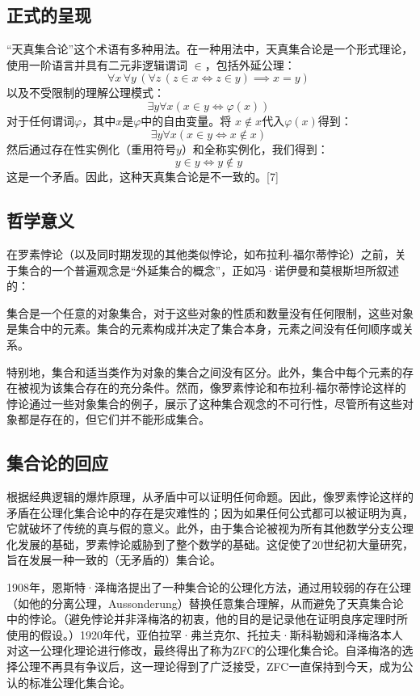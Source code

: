 \subsection{正式的呈现}  
“天真集合论”这个术语有多种用法。在一种用法中，天真集合论是一个形式理论，使用一阶语言并具有二元非逻辑谓词  
\(\in\)，包括外延公理：
\[
\forall x\,\forall y\,(\forall z\,(z \in x \iff z \in y) \implies x = y)~
\]
以及不受限制的理解公理模式：
\[
\exists y \forall x (x \in y \iff \varphi(x))~
\]
对于任何谓词\(\varphi\)，其中\(x\)是\(\varphi\)中的自由变量。将  
\(x \notin x\)代入\(\varphi(x)\)得到：
\[
\exists y \forall x (x \in y \iff x \notin x)~
\]
然后通过存在性实例化（重用符号\(y\)）和全称实例化，我们得到：
\[
y \in y \iff y \notin y~
\]
这是一个矛盾。因此，这种天真集合论是不一致的。[7]
\subsection{哲学意义}  
在罗素悖论（以及同时期发现的其他类似悖论，如布拉利-福尔蒂悖论）之前，关于集合的一个普遍观念是“外延集合的概念”，正如冯·诺伊曼和莫根斯坦所叙述的：

集合是一个任意的对象集合，对于这些对象的性质和数量没有任何限制，这些对象是集合中的元素。集合的元素构成并决定了集合本身，元素之间没有任何顺序或关系。

特别地，集合和适当类作为对象的集合之间没有区分。此外，集合中每个元素的存在被视为该集合存在的充分条件。然而，像罗素悖论和布拉利-福尔蒂悖论这样的悖论通过一些对象集合的例子，展示了这种集合观念的不可行性，尽管所有这些对象都是存在的，但它们并不能形成集合。
\subsection{集合论的回应}  
根据经典逻辑的爆炸原理，从矛盾中可以证明任何命题。因此，像罗素悖论这样的矛盾在公理化集合论中的存在是灾难性的；因为如果任何公式都可以被证明为真，它就破坏了传统的真与假的意义。此外，由于集合论被视为所有其他数学分支公理化发展的基础，罗素悖论威胁到了整个数学的基础。这促使了20世纪初大量研究，旨在发展一种一致的（无矛盾的）集合论。

1908年，恩斯特·泽梅洛提出了一种集合论的公理化方法，通过用较弱的存在公理（如他的分离公理，Aussonderung）替换任意集合理解，从而避免了天真集合论中的悖论。（避免悖论并非泽梅洛的初衷，他的目的是记录他在证明良序定理时所使用的假设。）1920年代，亚伯拉罕·弗兰克尔、托拉夫·斯科勒姆和泽梅洛本人对这一公理化理论进行修改，最终得出了称为ZFC的公理化集合论。自泽梅洛的选择公理不再具有争议后，这一理论得到了广泛接受，ZFC一直保持到今天，成为公认的标准公理化集合论。

